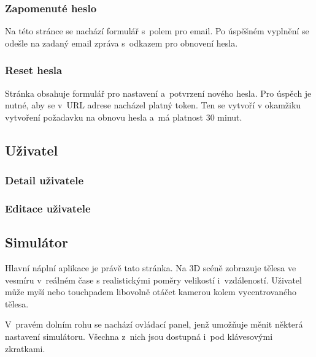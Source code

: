 \documentclass[a4paper,12pt]{article}
\begin{document}
\subsubsection{Zapomenuté heslo}

Na této stránce se nachází formulář s~polem pro email. Po úspěšném vyplnění se odešle na zadaný email zpráva s~odkazem pro obnovení hesla.

\subsubsection{Reset hesla}

Stránka obsahuje formulář pro nastavení a~potvrzení nového hesla. Pro úspěch je nutné, aby se v~URL adrese nacházel platný token. Ten se vytvoří v okamžiku vytvoření požadavku na obnovu hesla a~má platnost 30 minut.

\subsection{Uživatel}

\subsubsection{Detail uživatele}

\subsubsection{Editace uživatele}
	
\subsection{Simulátor}

Hlavní náplní aplikace je právě tato stránka. Na 3D scéně zobrazuje tělesa ve vesmíru v~reálném čase s realistickými poměry velikostí i~vzdáleností. Uživatel může myší nebo touchpadem libovolně otáčet kamerou kolem vycentrovaného tělesa.

V~pravém dolním rohu se nachází ovládací panel, jenž umožňuje měnit některá nastavení simulátoru. Všechna z~nich jsou dostupná i~pod klávesovými zkratkami.
\end{document}
